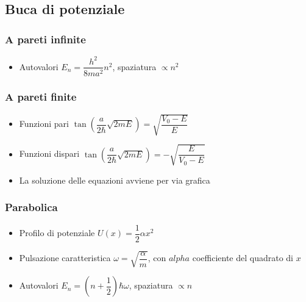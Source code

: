 \documentclass{article}
\begin{document}
\subsection{Buca di potenziale}

\subsubsection{A pareti infinite}
\begin{itemize}
  \item Autovalori \( E_n = \dfrac{h^2}{8 m a ^2} n^2 \), spaziatura \( \propto n^2 \)
\end{itemize}

\subsubsection{A pareti finite}
\begin{itemize}
  \item Funzioni pari \( \tan\left( \dfrac{a}{2 \hbar} \sqrt{2mE} \right) = \sqrt{\dfrac{V_0 - E}{E}} \)
  \item Funzioni dispari \( \tan\left( \dfrac{a}{2 \hbar} \sqrt{2mE} \right) = - \sqrt{\dfrac{E}{V_0 - E}} \)
  \item La soluzione delle equazioni avviene per via grafica
\end{itemize}

\subsubsection{Parabolica}
\begin{itemize}
  \item Profilo di potenziale \( U(x) = \dfrac{1}{2} \alpha x ^ 2 \)
  \item Pulsazione caratteristica \( \displaystyle \omega = \sqrt{\dfrac{\alpha}{m}} \), con \( alpha \) coefficiente del quadrato di \( x \)
  \item Autovalori \( E_n = \left( n + \dfrac{1}{2} \right) \hbar \omega \),  spaziatura \( \propto n \)
\end{itemize}
\end{document}
